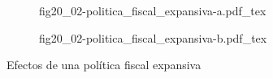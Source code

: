 \begin{figure}[h]
\captionsetup[subfigure]{aboveskip=20pt,belowskip=15pt}
\centering
\begin{subfigure}{.45\textwidth}
  \centering
        \def\svgwidth{\textwidth}
        {fig20_02-politica_fiscal_expansiva-a.pdf_tex}
\end{subfigure}\hspace{.05\textwidth}
\begin{subfigure}{.45\textwidth}
  \centering
        \def\svgwidth{\textwidth}
        {fig20_02-politica_fiscal_expansiva-b.pdf_tex}
\end{subfigure}
\caption{Efectos de una política fiscal expansiva}
\label{fig20_02-politica_fiscal_expansiva}
\end{figure}